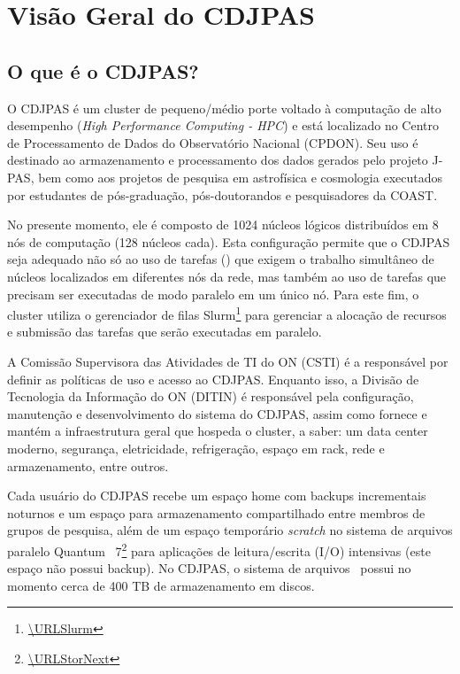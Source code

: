 \chapter{Visão Geral do CDJPAS}
\label{chap:visao-geral-do-cdjpas}

\section{O que é o CDJPAS?}
\label{sec:o-que-e-o-cdjpas}

O CDJPAS é um cluster de pequeno/médio porte voltado à computação de alto desempenho (\textit{High Performance Computing - HPC}) e está localizado no Centro de Processamento de Dados do Observatório Nacional (CPDON). Seu uso é destinado ao armazenamento e processamento dos dados gerados pelo projeto J-PAS, bem como aos projetos de pesquisa em astrofísica e cosmologia executados por estudantes de pós-graduação, pós-doutorandos e pesquisadores da COAST.

No presente momento, ele é composto de 1024 núcleos lógicos distribuídos em 8 nós de computação (128 núcleos cada). Esta configuração permite que o CDJPAS seja adequado não só ao uso de tarefas (\jobs) que exigem o trabalho simultâneo de núcleos localizados em diferentes nós da rede, mas também ao uso de tarefas que precisam ser executadas de modo paralelo em um único nó. Para este fim, o cluster utiliza o gerenciador de filas Slurm\footnote{\url{\URLSlurm}} para gerenciar a alocação de recursos e submissão das tarefas que serão executadas em paralelo.

A Comissão Supervisora das Atividades de TI do ON (CSTI) é a responsável por definir as políticas de uso e acesso ao CDJPAS. Enquanto isso, a Divisão de Tecnologia da Informação do ON (DITIN) é responsável pela configuração, manutenção e desenvolvimento do sistema do CDJPAS, assim como fornece e mantém a infraestrutura geral que hospeda o cluster, a saber: um data center moderno, segurança, eletricidade, refrigeração, espaço em rack, rede e armazenamento, entre outros.

Cada usuário do CDJPAS recebe um espaço home com backups incrementais noturnos e um espaço para armazenamento compartilhado entre membros de grupos de pesquisa, além de um espaço temporário \textit{scratch} no sistema de arquivos paralelo Quantum \stornext\ 7\footnote{\url{\URLStorNext}} para aplicações de leitura/escrita (I/O) intensivas (este espaço não possui backup). No CDJPAS, o sistema de arquivos \stornext\ possui no momento cerca de 400 TB de armazenamento em discos.

